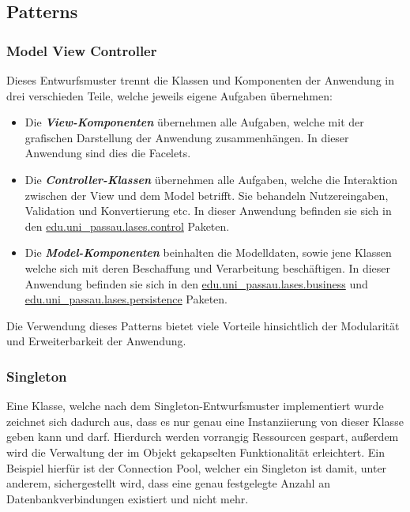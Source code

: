 \subsection{Patterns}\label{arch:patterns}

\subsubsection{Model View Controller}
Dieses Entwurfsmuster trennt die Klassen und Komponenten der Anwendung in drei
verschieden Teile, welche jeweils eigene Aufgaben übernehmen:
\begin{itemize}
    \item Die \emph{\textbf{View-Komponenten}} übernehmen alle Aufgaben,
    welche mit der grafischen Darstellung der Anwendung zusammenhängen.
    In dieser Anwendung sind dies die Facelets. %
    \item Die \emph{\textbf{Controller-Klassen}} übernehmen alle Aufgaben,
    welche die Interaktion zwischen der View und dem Model betrifft. Sie behandeln
    Nutzereingaben, Validation und Konvertierung etc. In dieser Anwendung befinden sie
    sich in den \hyperref[arch:control]{edu.uni\_passau.lases.control} Paketen.
    \item Die \emph{\textbf{Model-Komponenten}} beinhalten die Modelldaten, sowie jene
    Klassen welche sich mit deren Beschaffung und Verarbeitung beschäftigen. In dieser
    Anwendung befinden sie sich in den \hyperref[arch:business]{edu.uni\_passau.lases.business}
    und \hyperref[arch:persistence]{edu.uni\_passau.lases.persistence} Paketen.
\end{itemize}
Die Verwendung dieses Patterns bietet viele Vorteile hinsichtlich der Modularität
und Erweiterbarkeit der Anwendung.

\subsubsection{Singleton}
Eine Klasse, welche nach dem Singleton-Entwurfsmuster implementiert wurde zeichnet
sich dadurch aus, dass es nur genau eine Instanziierung von dieser Klasse geben
kann und darf. Hierdurch werden vorrangig Ressourcen gespart, außerdem wird die
Verwaltung der im Objekt gekapselten Funktionalität erleichtert.
Ein Beispiel hierfür ist der Connection Pool, %
welcher ein Singleton ist damit, unter anderem, sichergestellt wird, dass
eine genau festgelegte Anzahl an Datenbankverbindungen existiert und nicht mehr.

